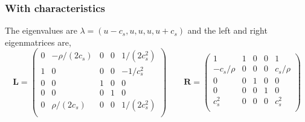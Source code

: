 \documentclass{article}
\begin{document}
\subsubsection{With characteristics}
The eigenvalues are $\lambda = (u-c_s, u,u,u,u + c_s)$ and the left and right eigenmatrices are,
\begin{equation}
 \mathbf{L} = 
 \begin{pmatrix}
  0 & - \rho/(2 c_s) & 0 & 0 & 1/(2 c_s^2) \\ 
  1 & 0 & 0 & 0 & -1/c_s^2 \\
  0 & 0 & 1 & 0 & 0 \\
  0 & 0 & 0 & 1 & 0 \\
  0 & \rho/(2 c_s) & 0 & 0 & 1/(2 c_s^2)\\
 \end{pmatrix}
 \qquad
 \mathbf{R} = 
 \begin{pmatrix}
  1         & 1 & 0 & 0 & 1 \\ 
  -c_s/\rho & 0 & 0 & 0 & c_s/\rho \\
  0         & 0 & 1 & 0 & 0 \\
  0         & 0 & 0 & 1 & 0 \\
  c_s^2     & 0 & 0 & 0 & c_s^2 \\
 \end{pmatrix}
\end{equation}
\end{document}

